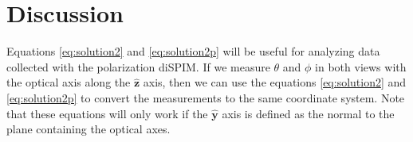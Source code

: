 \documentclass[11pt]{article}
\providecommand{\mh}[1]{\mathbf{\hat{#1}}}
\begin{document}
\section{Discussion}
Equations \ref{eq:solution2} and \ref{eq:solution2p} will be useful for
analyzing data collected with the polarization diSPIM. If we measure $\theta$
and $\phi$ in both views with the optical axis along the $\mh{z}$ axis, then we
can use the equations \ref{eq:solution2} and \ref{eq:solution2p} to convert the
measurements to the same coordinate system. Note that these equations will only
work if the $\mh{y}$ axis is defined as the normal to the plane containing the
optical axes.
\end{document}
